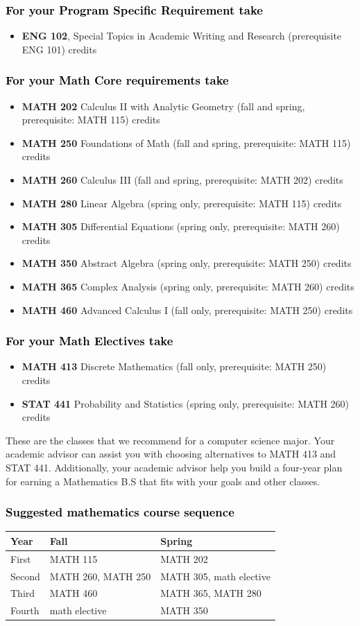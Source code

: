 \documentclass[11pt]{article}
\newcommand{\calconeshort}{MATH 115}
\newcommand{\calctwo}{\textbf{MATH 202} Calculus II with Analytic Geometry (fall and spring, prerequisite: MATH 115) \dotfill 5 credits }
\newcommand{\calctwoshort}{MATH 202}
\newcommand{\foundations}{\textbf{MATH 250} Foundations of Math (fall and spring, prerequisite: MATH 115)  \dotfill 3 credits}
\newcommand{\foundationsshort}{MATH 250}
\newcommand{\calcthree}{\textbf{MATH 260} Calculus III  (fall and spring, prerequisite: MATH 202) \dotfill 5 credits}
\newcommand{\calcthreeshort}{MATH 260}
\newcommand{\linear}{\textbf{MATH 280} Linear Algebra (spring only, prerequisite: MATH 115) \dotfill 3 credits}
\newcommand{\linearshort}{MATH 280}
\newcommand{\discrete}{\textbf{MATH 413} Discrete Mathematics  (fall only, prerequisite: MATH 250)\dotfill 3 credits}
\newcommand{\discreteshort}{MATH 413}
\newcommand{\statistics}{\textbf{STAT 441} Probability and Statistics (spring only, prerequisite: MATH 260)  \dotfill  3 credits}
\newcommand{\statisticsshort}{STAT 441}
\newcommand{\diffeq}{\textbf{MATH 305}	Differential Equations (spring only, prerequisite: MATH 260) \dotfill 	3 credits}
\newcommand{\diffeqshort}{MATH 305}
\newcommand{\abstractalgebra}{\textbf{MATH 350}	Abstract Algebra (spring only, prerequisite: MATH 250) \dotfill 	3 credits}
\newcommand{\abstractalgebrashort}{MATH 350}
\newcommand{\complex}{\textbf{MATH 365}	Complex Analysis (spring only,  prerequisite: MATH 260) \dotfill 3 credits}
\newcommand{\complexshort}{MATH 365}
\newcommand{\advancedcalc}{\textbf{MATH 460}	Advanced Calculus I  (fall only,   prerequisite: MATH 250) \dotfill 3 credits}
\newcommand{\advancedcalcshort}{MATH 460}
\newcommand{\mathBS}{
     \begin{center}
         \begin{tabular}[h]{| l | l | l|} 
            \hline
            \textbf{Year}           & \textbf{Fall}         &  \textbf{Spring}  \\ \hline 
            First & \calconeshort{}  & \calctwoshort \\  \hline
            Second &  \calcthreeshort{}, \foundationsshort & \diffeqshort, math elective \\ \hline
            Third & \advancedcalcshort              &  \complexshort{}, \linearshort \\ \hline
            Fourth & math elective &  \abstractalgebrashort  \\ \hline
         \end{tabular}
\end{center}}
\begin{document}
\subsubsection*{\textcolor{black}{For your Program Specific Requirement take}}

\begin{itemize}
   \item \textbf{ENG 102}, Special Topics in Academic Writing and Research (prerequisite ENG 101)   credits
\end{itemize}

	

\subsubsection*{\textcolor{black}{For your Math Core requirements take}}

\begin{itemize}
   \item \calctwo
   \item \foundations
      \item \calcthree
   \item \linear
   \item \diffeq
  \item \abstractalgebra
  \item \complex
  \item \advancedcalc
\end{itemize}



\subsubsection*{\textcolor{black}{For your  Math Electives take}}
\begin{itemize}
\item \discrete
\item \statistics
\end{itemize}
\vspace{0.1in}
These are the classes that we recommend for a computer science major.
Your academic advisor can assist you with choosing alternatives 
to \discreteshort{} and \statisticsshort{}. Additionally, your 
academic advisor help you build a four-year plan for earning a 
Mathematics B.S that fits with your goals and other classes.



\subsubsection*{\textcolor{black}{Suggested mathematics course sequence}}
   \mathBS
\end{document}
